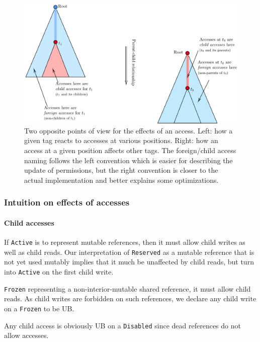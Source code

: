 \documentclass[a4paper,11pt]{article}
\theoremstyle{plain}
\theoremstyle{definition}
\theoremstyle{remark}
\newcommand{\tperm}[1]{\texttt{#1}}
\begin{document}
\begin{figure}
    \includegraphics[width=\textwidth]{../figs/child-or-foreign.pdf}
    \caption{Two opposite points of view for the effects of an access.
    Left: how a given tag reacts to accesses at various positions.
    Right: how an access at a given position affects other tags.
    The foreign/child access naming follows the left convention which is easier
    for describing the update of permissions, but the right convention is closer
    to the actual implementation and better explains some optimizations.}
    \label{fig:access-pov}
\end{figure}

\subsubsection{Intuition on effects of accesses}
\label{sec:transitions-basic}

\paragraph*{Child accesses}

If \tperm{Active} is to represent mutable references, then it must allow child writes
as well as child reads. Our interpretation of \tperm{Reserved} as a mutable reference
that is not yet used mutably implies that it much be unaffected by child reads,
but turn into \tperm{Active} on the first child write.

\tperm{Frozen} representing a non-interior-mutable shared reference, it must allow
child reads. As child writes are forbidden on such references, we declare any
child write on a \tperm{Frozen} to be UB.

Any child access is obviously UB on a \tperm{Disabled} since dead references
do not allow accesses.
\end{document}
